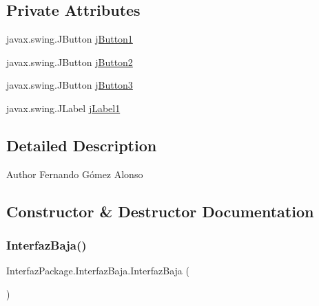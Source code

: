 \subsection*{Private Attributes}
\begin{DoxyCompactItemize}
\item 
javax.\+swing.\+J\+Button \mbox{\hyperlink{class_interfaz_package_1_1_interfaz_baja_a12d3d95e2abdc0965a784087da80b5e0}{j\+Button1}}
\item 
javax.\+swing.\+J\+Button \mbox{\hyperlink{class_interfaz_package_1_1_interfaz_baja_ab8ddc56f0ab1aa53f4e8e0f6724b1c98}{j\+Button2}}
\item 
javax.\+swing.\+J\+Button \mbox{\hyperlink{class_interfaz_package_1_1_interfaz_baja_aacfa87c1b80522aa3156f4e63a3fda84}{j\+Button3}}
\item 
javax.\+swing.\+J\+Label \mbox{\hyperlink{class_interfaz_package_1_1_interfaz_baja_a145dfd99a3540638ebf1c737eae819e0}{j\+Label1}}
\end{DoxyCompactItemize}


\subsection{Detailed Description}
\begin{DoxyAuthor}{Author}
Fernando Gómez Alonso 
\end{DoxyAuthor}


\subsection{Constructor \& Destructor Documentation}
\mbox{\label{class_interfaz_package_1_1_interfaz_baja_a27932d334092f5a28a7cd3124c5e0ec1}} 
\subsubsection{\texorpdfstring{Interfaz\+Baja()}{InterfazBaja()}}
{\footnotesize\ttfamily Interfaz\+Package.\+Interfaz\+Baja.\+Interfaz\+Baja (\begin{DoxyParamCaption}{ }\end{DoxyParamCaption})\hspace{0.3cm}{\ttfamily [inline]}}


